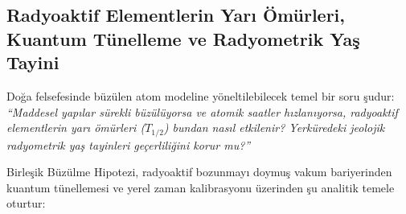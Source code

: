 \subsection{Radyoaktif Elementlerin Yarı Ömürleri, Kuantum Tünelleme ve Radyometrik Yaş Tayini}
\label{sec:radyoaktif_yari_omur}

Doğa felsefesinde büzülen atom modeline yöneltilebilecek temel bir soru şudur: \textit{``Maddesel yapılar sürekli büzülüyorsa ve atomik saatler hızlanıyorsa, radyoaktif elementlerin yarı ömürleri ($T_{1/2}$) bundan nasıl etkilenir? Yerküredeki jeolojik radyometrik yaş tayinleri geçerliliğini korur mu?''}

Birleşik Büzülme Hipotezi, radyoaktif bozunmayı doymuş vakum bariyerinden kuantum tünellemesi ve yerel zaman kalibrasyonu üzerinden şu analitik temele oturtur:

